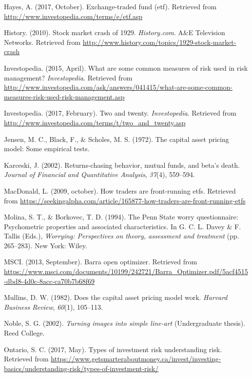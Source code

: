 \documentclass[12pt,twoside]{reedthesis}
\theoremstyle{definition}
\theoremstyle{definition}
\theoremstyle{definition}
\theoremstyle{remark}
\begin{document}
\hypertarget{ref-hayes2017}{}
Hayes, A. (2017, October). Exchange-traded fund (etf). Retrieved from
\url{http://www.investopedia.com/terms/e/etf.asp}

\hypertarget{ref-history2010}{}
History. (2010). Stock market crash of 1929. \emph{History.com}. A\&E
Television Networks. Retrieved from
\url{http://www.history.com/topics/1929-stock-market-crash}

\hypertarget{ref-investopedia2015}{}
Investopedia. (2015, April). What are some common measures of risk used
in risk management? \emph{Investopedia}. Retrieved from
\url{http://www.investopedia.com/ask/answers/041415/what-are-some-common-measures-risk-used-risk-management.asp}

\hypertarget{ref-investopedia2017}{}
Investopedia. (2017, February). Two and twenty. \emph{Investopedia}.
Retrieved from
\url{http://www.investopedia.com/terms/t/two_and_twenty.asp}

\hypertarget{ref-jensen1972}{}
Jensen, M. C., Black, F., \& Scholes, M. S. (1972). The capital asset
pricing model: Some empirical tests.

\hypertarget{ref-karceski2002}{}
Karceski, J. (2002). Returns-chasing behavior, mutual funds, and beta's
death. \emph{Journal of Financial and Quantitative Analysis},
\emph{37}(4), 559--594.

\hypertarget{ref-macdonald2009}{}
MacDonald, L. (2009, october). How traders are front-running etfs.
Retrieved from
\url{https://seekingalpha.com/article/165877-how-traders-are-front-running-etfs}

\hypertarget{ref-Molina1994}{}
Molina, S. T., \& Borkovec, T. D. (1994). The Penn State worry
questionnaire: Psychometric properties and associated characteristics.
In G. C. L. Davey \& F. Tallis (Eds.), \emph{Worrying: Perspectives on
theory, assessment and treatment} (pp. 265--283). New York: Wiley.

\hypertarget{ref-msci2013}{}
MSCI. (2013, September). Barra open optimizer. Retrieved from
\url{https://www.msci.com/documents/10199/242721/Barra_Optimizer.pdf/5acf4515-dbd8-4d0c-8acc-ca70b7b68f69}

\hypertarget{ref-mullins1982}{}
Mullins, D. W. (1982). Does the capital asset pricing model work.
\emph{Harvard Business Review}, \emph{60}(1), 105--113.

\hypertarget{ref-noble2002}{}
Noble, S. G. (2002). \emph{Turning images into simple line-art}
(Undergraduate thesis). Reed College.

\hypertarget{ref-ontario2017}{}
Ontario, S. C. (2017, May). Types of investment risk \textbar{}
understanding risk. Retrieved from
\url{https://www.getsmarteraboutmoney.ca/invest/investing-basics/understanding-risk/types-of-investment-risk/}
\end{document}
